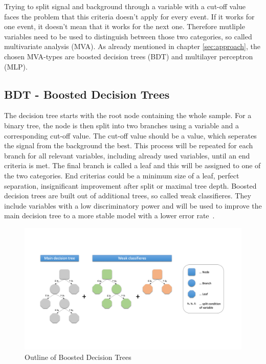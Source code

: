 \documentclass[11pt]{scrartcl}
\begin{document}
Trying to split signal and background through a variable with a cut-off value faces the problem that this criteria doesn't apply for every event. If it works for one event, it doesn't mean that it works for the next one. Therefore mutliple variables need to be used to distinguish between those two categories, so called multivariate analysis (MVA). As already mentioned in chapter \ref{sec:approach}, the chosen MVA-types are boosted decision trees (BDT) and multilayer perceptron (MLP).

	\subsection{BDT - Boosted Decision Trees}
	The decision tree starts with the root node containing the whole sample. For a binary tree, the node is then split into two branches using a variable and a corresponding cut-off value. The cut-off value should be a value, which seperates the signal from the background the best. This process will be repeated for each branch for all relevant variables, including already used variables, until an end criteria is met. The final branch is called a leaf and this will be assigned to one of the two categories. End criterias could be a minimum size of a leaf, perfect separation, insignificant improvement after split or maximal tree depth. Boosted decision trees are built out of additional trees, so called weak classifieres. They include variables with a low discriminatory power and will be used to improve the main decision tree to a more stable model with a lower error rate~\cite{BDT}. 

	\begin{figure}[H]
	\centering
	\includegraphics[width=1\textwidth]{figures/BDT.png}
	\caption{Outline of Boosted Decision Trees}
	\end{figure}
	
\end{document}
